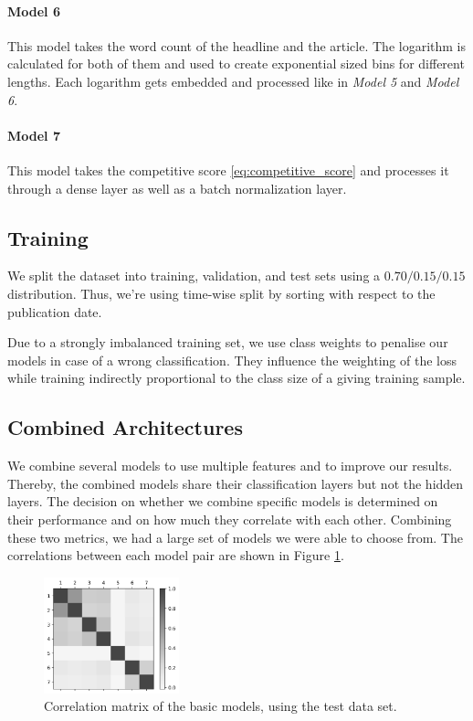\paragraph{Model 6} 
This model takes the word count of the headline and the article. The logarithm is calculated for both of them and used to create exponential sized bins for different lengths. Each logarithm gets embedded and processed like in \textit{Model 5} and \textit{Model 6}.

\paragraph{Model 7} 
This model takes the competitive score \ref{eq:competitive_score} and processes it through a dense layer as well as a batch normalization layer.

\subsection{Training}
We split the dataset into training, validation, and test sets using a $0.70/0.15/0.15$ distribution. Thus, we're using time-wise split by sorting with respect to the publication date.

Due to a strongly imbalanced training set, we use class weights to penalise our models in case of a wrong classification. They influence the weighting of the loss while training indirectly proportional to the class size of a giving training sample.

\subsection{Combined Architectures}
We combine several models to use multiple features and to improve our results. Thereby, the combined models share their classification layers but not the hidden layers.
The decision on whether we combine specific models is determined on their performance and on how much they correlate with each other. Combining these two metrics, we had a large set of models we were able to choose from. The correlations between each model pair are shown in Figure \ref{fig:correlation_matrix}. 

\begin{figure}
	\includegraphics[width=0.35\textwidth]{fig/correlations_bw.png}
	\caption{Correlation matrix of the basic models, using the test data set.}
	\label{fig:correlation_matrix}
\end{figure}